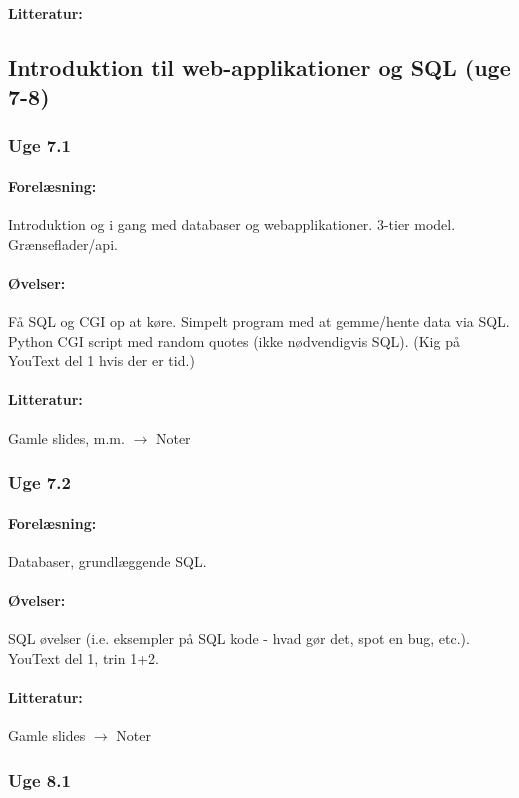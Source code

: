 \documentclass[12pt]{article}
\begin{document}
\paragraph{Litteratur:}

\subsection{Introduktion til web-applikationer og SQL (uge 7-8)}
\subsubsection{Uge 7.1}
\paragraph{Forelæsning:} 
Introduktion og i gang med databaser og webapplikationer.
3-tier model. Grænseflader/api.
\paragraph{Øvelser:}
Få SQL og CGI op at køre.
Simpelt program med at gemme/hente data via SQL.
Python CGI script med random quotes (ikke nødvendigvis SQL).
(Kig på YouText del 1 hvis der er tid.)
\paragraph{Litteratur:} Gamle slides, m.m. $\rightarrow$ Noter

\subsubsection{Uge 7.2}
\paragraph{Forelæsning:}
Databaser, grundlæggende SQL.
\paragraph{Øvelser:}
SQL øvelser (i.e. eksempler på SQL kode - hvad gør det, spot en bug, etc.).
YouText del 1, trin 1+2.
\paragraph{Litteratur:} Gamle slides $\rightarrow$ Noter 

\subsubsection{Uge 8.1}
\end{document}
